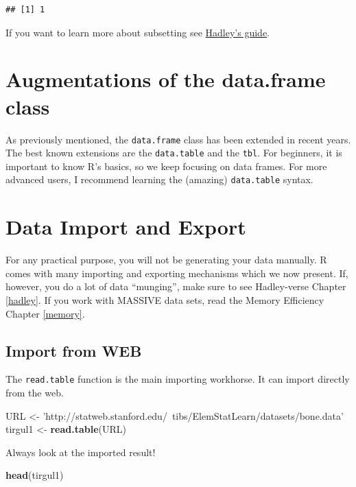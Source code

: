 \documentclass[]{book}
\newenvironment{Shaded}{\begin{snugshade}}{\end{snugshade}}
\newcommand{\KeywordTok}[1]{\textcolor[rgb]{0.13,0.29,0.53}{\textbf{#1}}}
\newcommand{\StringTok}[1]{\textcolor[rgb]{0.31,0.60,0.02}{#1}}
\newcommand{\NormalTok}[1]{#1}
\theoremstyle{definition}
\theoremstyle{definition}
\theoremstyle{definition}
\theoremstyle{remark}
\begin{document}
\begin{verbatim}
## [1] 1
\end{verbatim}

If you want to learn more about subsetting see
\href{http://adv-r.had.co.nz/Subsetting.html}{Hadley's guide}.

\section{Augmentations of the data.frame
class}\label{augmentations-of-the-data.frame-class}

As previously mentioned, the \texttt{data.frame} class has been extended
in recent years. The best known extensions are the \texttt{data.table}
and the \texttt{tbl}. For beginners, it is important to know R's basics,
so we keep focusing on data frames. For more advanced users, I recommend
learning the (amazing) \texttt{data.table} syntax.

\section{Data Import and Export}\label{data-import-and-export}

For any practical purpose, you will not be generating your data
manually. R comes with many importing and exporting mechanisms which we
now present. If, however, you do a lot of data ``munging'', make sure to
see Hadley-verse Chapter \ref{hadley}. If you work with MASSIVE data
sets, read the Memory Efficiency Chapter \ref{memory}.

\subsection{Import from WEB}\label{import-from-web}

The \texttt{read.table} function is the main importing workhorse. It can
import directly from the web.

\begin{Shaded}
\begin{Highlighting}[]
\NormalTok{URL <-}\StringTok{ 'http://statweb.stanford.edu/~tibs/ElemStatLearn/datasets/bone.data'}
\NormalTok{tirgul1 <-}\StringTok{ }\KeywordTok{read.table}\NormalTok{(URL)}
\end{Highlighting}
\end{Shaded}

Always look at the imported result!

\begin{Shaded}
\begin{Highlighting}[]
\KeywordTok{head}\NormalTok{(tirgul1)}
\end{Highlighting}
\end{Shaded}
\end{document}
